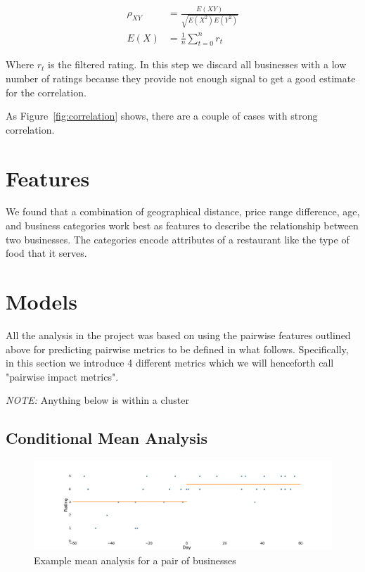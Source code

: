 \documentclass{vldb}
\begin{document}
\begin{align*}
    \rho_{XY} &= \frac{E(XY)}{\sqrt{E(X^2) E(Y^2)}} \\
    E(X) &= \frac{1}{n} \sum_{t = 0}^{n} r_t
\end{align*}

Where $r_t$ is the filtered rating.
In this step we discard all businesses with a low number of ratings because they provide not enough signal to get a good estimate for the correlation.

As Figure~\ref{fig:correlation} shows, there are a couple of cases with strong correlation.

\section{Features}
We found that a combination of geographical distance, price range difference, age, and business categories work best as features to describe the relationship between two businesses. The categories encode attributes of a restaurant like the type of food that it serves.

\section{Models}
All the analysis in the project was based on using the pairwise features outlined above for predicting pairwise metrics to be defined in what follows. Specifically, in this section we introduce 4 different metrics which we will henceforth call "pairwise impact metrics". 

\textit{NOTE:} Anything below is within a cluster



\subsection*{Conditional Mean Analysis}

\begin{figure}[h]
\centering
\includegraphics[width=\columnwidth]{mean.pdf}
\caption{Example mean analysis for a pair of businesses}
\end{figure}
\end{document}

